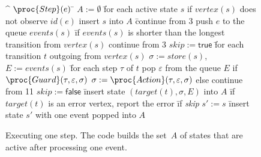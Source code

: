 \documentclass[9pt, preprint]{sigplanconf} %
\theoremstyle{definition}
\theoremstyle{remark}
\begin{document}
%


\begin{figure}[t]
\begin{center}
\begin{alg}
\^  $\proc{Step}(e)$
\=  $A := \emptyset$
\=  for each active state $s$
\+    if $\mathit{vertex}(s)$ does not observe $\mathit{id}(e)$
\+      insert $s$ into $A$
\=      continue from $3$
\-    push $e$ to the queue $\mathit{events}(s)$
\=    if $\mathit{events}(s)$ is shorter than the longest transition from $\mathit{vertex}(s)$
\+      continue from $3$
\1    $\mathit{skip}:=\mathsf{true}$
\=    for each transition $t$ outgoing from $\mathit{vertex}(s)$
\+      $\sigma := \mathit{store}(s)$,\quad $E := \mathit{events}(s)$
\=      for each step $\tau$ of $t$
\+        pop $\varepsilon$ from the queue $E$
\+        if $\proc{Guard}(\tau, \varepsilon, \sigma)$
\+          $\sigma := \proc{Action}(\tau, \varepsilon, \sigma)$
\-        else
\+          continue from 11
\2      $\mathit{skip}:=\mathsf{false}$
\=      insert state $(\mathit{target}(t), \sigma, E)$ into $A$
\=      if $\mathit{target}(t)$ is an error vertex, report the error
\=      if \textit{skip}
\+        $s' := s$
\=        insert state $s'$ with one event popped into $A$
\end{alg}
\bigskip
\caption{
  Executing one step.
  The code builds the set~$A$ of states that are active after processing one event.
}
\label{fig:checker.step}
\end{center}
\end{figure}
\end{document}
